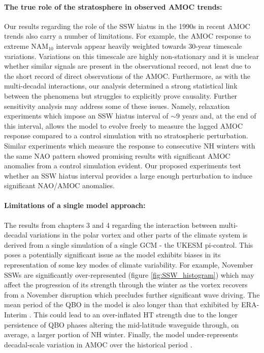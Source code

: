 \paragraph{The true role of the stratosphere in observed AMOC trends:}
Our results regarding the role of the SSW hiatus in the 1990s in recent AMOC trends also carry a number of limitations. For example, the AMOC response to extreme NAM$_{10}$ intervals appear heavily weighted towards 30-year timescale variations. Variations on this timescale are highly non-stationary and it is unclear whether similar signals are present in the observational record, not least due to the short record of direct observations of the AMOC. Furthermore, as with the multi-decadal interactions, our analysis determined a strong statistical link between the phenomena but struggles to explicitly prove causality. Further sensitivity analysis may address some of these issues. Namely, relaxation experiments which impose an SSW hiatus interval of $\sim9$ years and, at the end of this interval, allows the model to evolve freely to measure the lagged AMOC response compared to a control simulation with no stratospheric perturbation. Similar experiments which measure the response to consecutive NH winters with the same NAO pattern \citep{delworthImpact2016c} showed promising results with significant AMOC anomalies from a control simulation evident. Our proposed experiments test whether an SSW hiatus interval provides a large enough perturbation to induce significant NAO/AMOC anomalies.

\paragraph{Limitations of a single model approach:}
The results from chapters 3 and 4 regarding the interaction between multi-decadal variations in the polar vortex and other parts of the climate system is derived from a single simulation of a single GCM - the UKESM pi-control. This poses a potentially significant issue as the model exhibits biases in its representation of some key modes of climate variability. For example, November SSWs are significantly over-represented (figure \ref{fig:SSW_histogram}) which may affect the progression of its strength through the winter as the vortex recovers from a November disruption which precludes further significant wave driving. The mean period of the QBO in the model is also longer than that exhibited by ERA-Interim \citep{bushellEvaluation2020b}. This could lead to an over-inflated HT strength due to the longer persistence of QBO phases altering the mid-latitude waveguide through, on average, a larger portion of NH winter. Finally, the model under-represents decadal-scale variation in AMOC over the historical period \citep{robsonEvaluation2020d}. 

